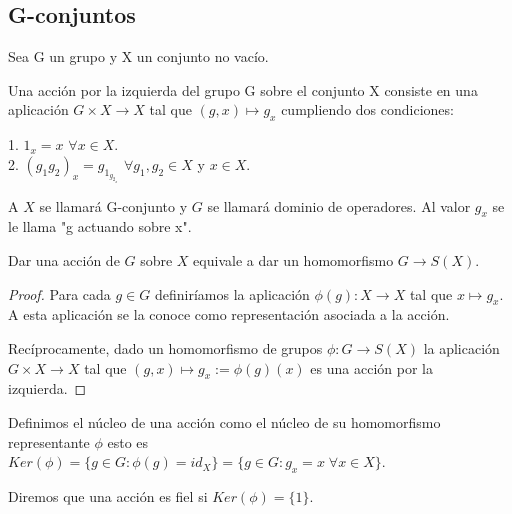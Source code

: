 \subsection{G-conjuntos}

\begin{definition}
Sea G un grupo y X un conjunto no vacío.

Una acción por la izquierda del grupo G sobre el conjunto X consiste en una aplicación $G \times X \rightarrow X$ tal que $(g,x) \mapsto g_x$ cumpliendo dos condiciones:

1. $1_x = x$ $\forall x \in X$.\\
2. $(g_1g_2)_x = g_{1_{g_{2_x}}}$ $\forall g_1,g_2 \in X$ y $x \in X$.

A $X$ se llamará G-conjunto y $G$ se llamará dominio de operadores. Al valor $g_x$ se le llama "g actuando sobre x". 
\end{definition}

\begin{proposition}
Dar una acción de $G$ sobre $X$ equivale a dar un homomorfismo $G \rightarrow S(X)$.
\end{proposition}
\begin{proof}
Para cada $g \in G$ definiríamos la aplicación $\phi(g):X \rightarrow X$ tal que $x \mapsto g_x$. A esta aplicación se la conoce como representación asociada a la acción.

Recíprocamente, dado un homomorfismo de grupos $\phi:G \rightarrow S(X)$ la aplicación $G \times X \rightarrow X$ tal que $(g,x) \mapsto g_x:= \phi(g)(x)$ es una acción por la izquierda.
\end{proof}

\begin{definition}
Definimos el núcleo de una acción como el núcleo de su homomorfismo representante $\phi$ esto es $Ker(\phi) = \{g \in G: \phi(g) = id_X\} = \{g \in G:g_x = x \; \forall x \in X\}$.

Diremos que una acción es fiel si $Ker(\phi) = \{1\}$.
\end{definition}


